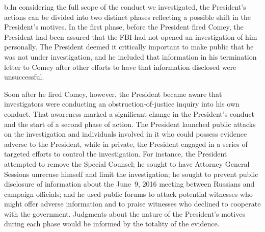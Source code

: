 b.\quad In considering the full scope of the conduct we investigated, the President's actions can be divided into two distinct phases reflecting a possible shift in the President's motives.
In the first phase, before the President fired Comey, the President had been assured that the FBI had not opened an investigation of him personally.
The President deemed it critically important to make public that he was not under investigation, and he included that information in his termination letter to Comey after other efforts to have that information disclosed were unsuccessful.

Soon after he fired Comey, however, the President became aware that investigators were conducting an obstruction-of-justice inquiry into his own conduct.
That awareness marked a significant change in the President's conduct and the start of a second phase of action.
The President launched public attacks on the investigation and individuals involved in it who could possess evidence adverse to the President, while in private, the President engaged in a series of targeted efforts to control the investigation.
For instance, the President attempted to remove the Special Counsel; he sought to have Attorney General Sessions unrecuse himself and limit the investigation; he sought to prevent public disclosure of information about the June~9, 2016 meeting between Russians and campaign officials; and he used public forums to attack potential witnesses who might offer adverse information and to praise witnesses who declined to cooperate with the government.
Judgments about the nature of the President's motives during each phase would be informed by the totality of the evidence.
